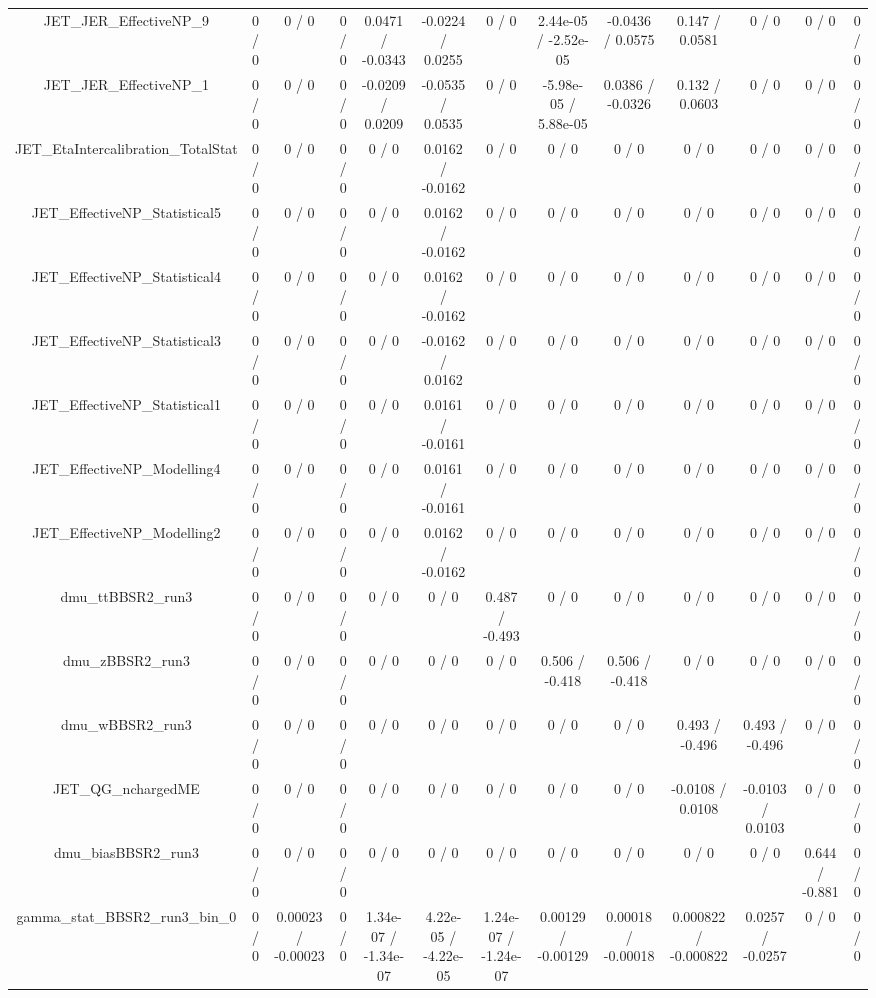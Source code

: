 \documentclass[10pt]{article}
\begin{document}
\begin{table}[htbp]
\begin{center}
\begin{tabular}{|c|c|c|c|c|c|c|c|c|c|c|c|c|}
  JET_JER_EffectiveNP_9 & 0 / 0 & 0 / 0 & 0 / 0 & 0.0471 / -0.0343 & -0.0224 / 0.0255 & 0 / 0 & 2.44e-05 / -2.52e-05 & -0.0436 / 0.0575 & 0.147 / 0.0581 & 0 / 0 & 0 / 0 & 0 / 0 \\ 
  JET_JER_EffectiveNP_1 & 0 / 0 & 0 / 0 & 0 / 0 & -0.0209 / 0.0209 & -0.0535 / 0.0535 & 0 / 0 & -5.98e-05 / 5.88e-05 & 0.0386 / -0.0326 & 0.132 / 0.0603 & 0 / 0 & 0 / 0 & 0 / 0 \\ 
  JET_EtaIntercalibration_TotalStat & 0 / 0 & 0 / 0 & 0 / 0 & 0 / 0 & 0.0162 / -0.0162 & 0 / 0 & 0 / 0 & 0 / 0 & 0 / 0 & 0 / 0 & 0 / 0 & 0 / 0 \\ 
  JET_EffectiveNP_Statistical5 & 0 / 0 & 0 / 0 & 0 / 0 & 0 / 0 & 0.0162 / -0.0162 & 0 / 0 & 0 / 0 & 0 / 0 & 0 / 0 & 0 / 0 & 0 / 0 & 0 / 0 \\ 
  JET_EffectiveNP_Statistical4 & 0 / 0 & 0 / 0 & 0 / 0 & 0 / 0 & 0.0162 / -0.0162 & 0 / 0 & 0 / 0 & 0 / 0 & 0 / 0 & 0 / 0 & 0 / 0 & 0 / 0 \\ 
  JET_EffectiveNP_Statistical3 & 0 / 0 & 0 / 0 & 0 / 0 & 0 / 0 & -0.0162 / 0.0162 & 0 / 0 & 0 / 0 & 0 / 0 & 0 / 0 & 0 / 0 & 0 / 0 & 0 / 0 \\ 
  JET_EffectiveNP_Statistical1 & 0 / 0 & 0 / 0 & 0 / 0 & 0 / 0 & 0.0161 / -0.0161 & 0 / 0 & 0 / 0 & 0 / 0 & 0 / 0 & 0 / 0 & 0 / 0 & 0 / 0 \\ 
  JET_EffectiveNP_Modelling4 & 0 / 0 & 0 / 0 & 0 / 0 & 0 / 0 & 0.0161 / -0.0161 & 0 / 0 & 0 / 0 & 0 / 0 & 0 / 0 & 0 / 0 & 0 / 0 & 0 / 0 \\ 
  JET_EffectiveNP_Modelling2 & 0 / 0 & 0 / 0 & 0 / 0 & 0 / 0 & 0.0162 / -0.0162 & 0 / 0 & 0 / 0 & 0 / 0 & 0 / 0 & 0 / 0 & 0 / 0 & 0 / 0 \\ 
  dmu_ttBBSR2_run3 & 0 / 0 & 0 / 0 & 0 / 0 & 0 / 0 & 0 / 0 & 0.487 / -0.493 & 0 / 0 & 0 / 0 & 0 / 0 & 0 / 0 & 0 / 0 & 0 / 0 \\ 
  dmu_zBBSR2_run3 & 0 / 0 & 0 / 0 & 0 / 0 & 0 / 0 & 0 / 0 & 0 / 0 & 0.506 / -0.418 & 0.506 / -0.418 & 0 / 0 & 0 / 0 & 0 / 0 & 0 / 0 \\ 
  dmu_wBBSR2_run3 & 0 / 0 & 0 / 0 & 0 / 0 & 0 / 0 & 0 / 0 & 0 / 0 & 0 / 0 & 0 / 0 & 0.493 / -0.496 & 0.493 / -0.496 & 0 / 0 & 0 / 0 \\ 
  JET_QG_nchargedME & 0 / 0 & 0 / 0 & 0 / 0 & 0 / 0 & 0 / 0 & 0 / 0 & 0 / 0 & 0 / 0 & -0.0108 / 0.0108 & -0.0103 / 0.0103 & 0 / 0 & 0 / 0 \\ 
  dmu_biasBBSR2_run3 & 0 / 0 & 0 / 0 & 0 / 0 & 0 / 0 & 0 / 0 & 0 / 0 & 0 / 0 & 0 / 0 & 0 / 0 & 0 / 0 & 0.644 / -0.881 & 0 / 0 \\ 
  gamma_stat_BBSR2_run3_bin_0 & 0 / 0 & 0.00023 / -0.00023 & 0 / 0 & 1.34e-07 / -1.34e-07 & 4.22e-05 / -4.22e-05 & 1.24e-07 / -1.24e-07 & 0.00129 / -0.00129 & 0.00018 / -0.00018 & 0.000822 / -0.000822 & 0.0257 / -0.0257 & 0 / 0 & 0 / 0 \\ 

\end{tabular}
\end{center}
\end{table}
\end{document}
